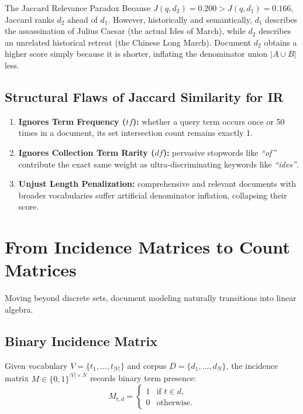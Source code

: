 \begin{alertblock}{The Jaccard Relevance Paradox}
Because $J(q, d_2) = 0.200 > J(q, d_1) = 0.166$, Jaccard ranks $d_2$ ahead of $d_1$.
However, historically and semantically, $d_1$ describes the assassination of Julius Caesar (the actual Ides of March), while $d_2$ describes an unrelated historical retreat (the Chinese Long March). Document $d_2$ obtains a higher score simply because it is shorter, inflating the denominator union $|A \cup B|$ less.
\end{alertblock}

\subsection{Structural Flaws of Jaccard Similarity for IR}
\begin{enumerate}
    \item \textbf{Ignores Term Frequency ($tf$):} whether a query term occurs once or 50 times in a document, its set intersection count remains exactly 1.
    \item \textbf{Ignores Collection Term Rarity ($df$):} pervasive stopwords like \textit{``of''} contribute the exact same weight as ultra-discriminating keywords like \textit{``ides''}.
    \item \textbf{Unjust Length Penalization:} comprehensive and relevant documents with broader vocabularies suffer artificial denominator inflation, collapsing their score.
\end{enumerate}

\FloatBarrier
\section{From Incidence Matrices to Count Matrices}
\label{sec:incidence-to-count-en}

Moving beyond discrete sets, document modeling naturally transitions into linear algebra.

\subsection{Binary Incidence Matrix}
Given vocabulary $V = \{t_1, \dots, t_{|V|}\}$ and corpus $D = \{d_1, \dots, d_N\}$, the incidence matrix $M \in \{0, 1\}^{|V| \times N}$ records binary term presence:
\begin{equation}
M_{t, d} = \begin{cases} 1 & \text{if } t \in d, \\ 0 & \text{otherwise.} \end{cases}
\end{equation}

